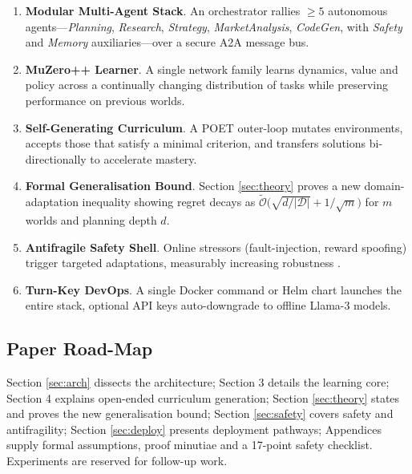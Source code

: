 \begin{enumerate}[label=\textbf{C\arabic*}.]
  \item \textbf{Modular Multi-Agent Stack}.  
        An orchestrator rallies $\ge 5$ autonomous agents—\emph{Planning},
        \emph{Research}, \emph{Strategy}, \emph{MarketAnalysis},
        \emph{CodeGen}, with \emph{Safety} and \emph{Memory} auxiliaries—over
        a secure \textsc{A2A} message bus.
  \item \textbf{MuZero++ Learner}.  
        A single network family learns dynamics, value and policy across a
        continually changing distribution of tasks while preserving
        performance on previous worlds.
  \item \textbf{Self-Generating Curriculum}.  
        A POET outer-loop mutates environments, accepts those that satisfy a
        minimal criterion, and transfers solutions bi-directionally to
        accelerate mastery.
  \item \textbf{Formal Generalisation Bound}.  
        Section \ref{sec:theory} proves a new domain-adaptation inequality
        showing regret decays as
        $\tilde{\mathcal O}\!\bigl(\sqrt{d/|\mathcal D|}+1/\sqrt m\bigr)$ for
        $m$ worlds and planning depth $d$.
  \item \textbf{Antifragile Safety Shell}.  
        Online stressors (fault-injection, reward spoofing) trigger targeted
        adaptations, measurably increasing robustness
        \parencite{amodei2016concrete,taleb2012antifragile}.
  \item \textbf{Turn-Key DevOps}.  
        A single Docker command or Helm chart launches the entire stack,
        optional API keys auto-downgrade to offline Llama-3 models.
\end{enumerate}

\subsection{Paper Road-Map}

Section \ref{sec:arch} dissects the architecture; Section 3 details the
learning core; Section 4 explains open-ended curriculum generation;
Section \ref{sec:theory} states and proves the new generalisation
bound; Section \ref{sec:safety} covers safety and antifragility;  
Section \ref{sec:deploy} presents deployment pathways; Appendices supply
formal assumptions, proof minutiae and a 17-point safety checklist.  
Experiments are reserved for follow-up work.

